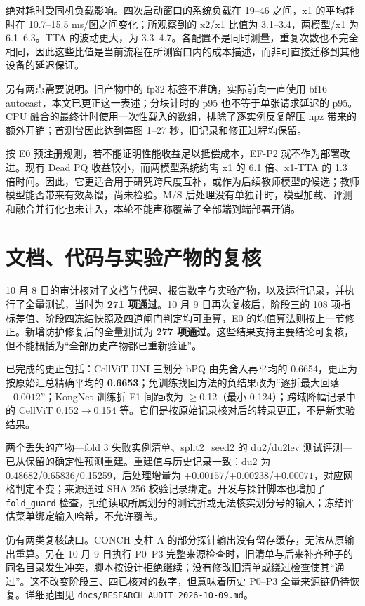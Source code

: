 \documentclass[11pt,a4paper,UTF8,fontset=fandol]{ctexart}
\newcommand{\code}[1]{\nolinkurl{#1}}
\begin{document}
绝对耗时受同机负载影响。四次启动窗口的系统负载在 19--46 之间，x1 的平均耗时在 10.7--15.5 ms/图之间变化；所观察到的 x2/x1 比值为 3.1--3.4，两模型/x1 为 6.1--6.3。TTA 的波动更大，为 3.3--4.7。各配置不是同时测量，重复次数也不完全相同，因此这些比值是当前流程在所测窗口内的成本描述，而非可直接迁移到其他设备的延迟保证。

另有两点需要说明。旧产物中的 fp32 标签不准确，实际前向一直使用 bf16 autocast，本文已更正这一表述；分块计时的 p95 也不等于单张请求延迟的 p95。CPU 融合的最终计时使用一次性载入的数组，排除了逐实例反复解压 npz 带来的额外开销；首测曾因此达到每图 1--27 秒，旧记录和修正过程均保留。

按 E0 预注册规则，若不能证明性能收益足以抵偿成本，EF-P2 就不作为部署改进。现有 Dead PQ 收益较小，而两模型系统约需 x1 的 6.1 倍、x1-TTA 的 1.3 倍时间。因此，它更适合用于研究跨尺度互补，或作为后续教师模型的候选；教师模型能否带来有效蒸馏，尚未检验。M/S 后处理没有单独计时，模型加载、评测和融合并行化也未计入，本轮不能声称覆盖了全部端到端部署开销。

\section{文档、代码与实验产物的复核}

10 月 8 日的审计核对了文档与代码、报告数字与实验产物，以及运行记录，并执行了全量测试，当时为 \textbf{271 项通过}。10 月 9 日再次复核后，阶段三的 108 项指标差值、阶段四冻结快照及四道闸门判定均可重算，E0 的均值算法则按上一节修正。新增防护修复后的全量测试为 \textbf{277 项通过}。这些结果支持主要结论可复核，但不能概括为“全部历史产物都已重新验证”。

已完成的更正包括：CellViT-UNI 三划分 bPQ 由先舍入再平均的 0.6654，更正为按原始汇总精确平均的 \textbf{0.6653}；免训练找回方法的负结果改为“逐折最大回落 $-0.0012$”；KongNet 训练折 F1 间距改为 $\geq$0.12（最小 0.124）；跨域降幅记录中的 CellViT 0.152$\to$0.154 等。它们是按原始记录核对后的转录更正，不是新实验结果。

两个丢失的产物---fold 3 失败实例清单、split2\_seed2 的 du2/du2lev 测试评测---已从保留的确定性预测重建。重建值与历史记录一致：du2 为 0.48682/0.65836/0.15259，后处理增量为 $+0.00157$/$+0.00238$/$+0.00071$，对应网格判定不变；来源通过 SHA-256 校验记录绑定。开发与探针脚本也增加了 \code{fold\_guard} 检查，拒绝读取所属划分的测试折或无法核实划分号的输入；冻结评估菜单绑定输入哈希，不允许覆盖。

仍有两类复核缺口。CONCH 支柱 A 的部分探针输出没有留存缓存，无法从原输出重算。另在 10 月 9 日执行 P0--P3 完整来源检查时，旧清单与后来补齐种子的同名目录发生冲突，脚本按设计拒绝继续；没有修改旧清单或绕过检查使其“通过”。这不改变阶段三、四已核对的数字，但意味着历史 P0--P3 全量来源链仍待恢复。详细范围见 \code{docs/RESEARCH\_AUDIT\_2026-10-09.md}。
\end{document}
